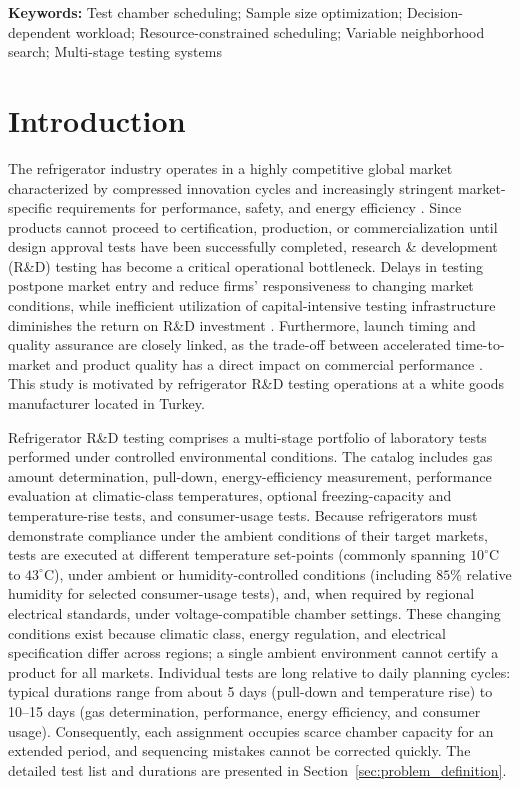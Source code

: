 \documentclass[11pt]{article}
\begin{document}
\textbf{Keywords:} Test chamber scheduling; Sample size optimization; Decision-dependent workload; Resource-constrained scheduling; Variable neighborhood search; Multi-stage testing systems

\section{Introduction}
\label{sec:introduction}

The refrigerator industry operates in a highly competitive global market characterized by compressed innovation cycles and increasingly stringent market-specific requirements for performance, safety, and energy efficiency \citep{IEA2021,IEC60335-1,IEC60335-2-24,IEC62552}. Since products cannot proceed to certification, production, or commercialization until design approval tests have been successfully completed, research \& development (R\&D) testing has become a critical operational bottleneck. Delays in testing postpone market entry and reduce firms' responsiveness to changing market conditions, while inefficient utilization of capital-intensive testing infrastructure diminishes the return on R\&D investment \citep{OECD_MSTI2024,OECD_MSTI2025}. Furthermore, launch timing and quality assurance are closely linked, as the trade-off between accelerated time-to-market and product quality has a direct impact on commercial performance \citep{KimKoenigsbergOfek2022}. This study is motivated by refrigerator R\&D testing operations at a white goods manufacturer located in Turkey.

Refrigerator R\&D testing comprises a multi-stage portfolio of laboratory tests performed under controlled environmental conditions. The catalog includes gas amount determination, pull-down, energy-efficiency measurement, performance evaluation at climatic-class temperatures, optional freezing-capacity and temperature-rise tests, and consumer-usage tests. Because refrigerators must demonstrate compliance under the ambient conditions of their target markets, tests are executed at different temperature set-points (commonly spanning \(10^\circ\mathrm{C}\) to \(43^\circ\mathrm{C}\)), under ambient or humidity-controlled conditions (including \(85\%\) relative humidity for selected consumer-usage tests), and, when required by regional electrical standards, under voltage-compatible chamber settings. These changing conditions exist because climatic class, energy regulation, and electrical specification differ across regions; a single ambient environment cannot certify a product for all markets. Individual tests are long relative to daily planning cycles: typical durations range from about 5 days (pull-down and temperature rise) to 10--15 days (gas determination, performance, energy efficiency, and consumer usage). Consequently, each assignment occupies scarce chamber capacity for an extended period, and sequencing mistakes cannot be corrected quickly. The detailed test list and durations are presented in Section~\ref{sec:problem_definition}.
\end{document}

